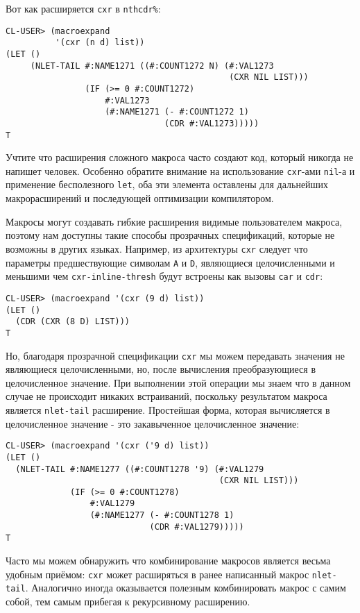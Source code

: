 Вот как расширяется \verb"cxr" в \verb"nthcdr%":

\begin{verbatim}
CL-USER> (macroexpand
          '(cxr (n d) list))
(LET ()
     (NLET-TAIL #:NAME1271 ((#:COUNT1272 N) (#:VAL1273 
                                             (CXR NIL LIST)))
                (IF (>= 0 #:COUNT1272)
                    #:VAL1273
                    (#:NAME1271 (- #:COUNT1272 1) 
                                (CDR #:VAL1273)))))
T
\end{verbatim}

Учтите что расширения сложного макроса часто создают код, который никогда не напишет человек. Особенно обратите внимание на использование \verb"cxr"-ами \verb"nil"-а и применение бесполезного \verb"let", оба эти элемента оставлены для дальнейших макрорасширений и последующей оптимизации компилятором.

Макросы могут создавать гибкие расширения видимые пользователем макроса, поэтому нам доступны такие способы прозрачных спецификаций, которые не возможны в других языках. Например, из архитектуры \verb"cxr" следует что параметры предшествующие символам \verb"A" и \verb"D", являющиеся целочисленными и меньшими чем \verb"cxr-inline-thresh" будут встроены как вызовы \verb"car" и \verb"cdr":

\begin{verbatim}
CL-USER> (macroexpand '(cxr (9 d) list))
(LET ()
  (CDR (CXR (8 D) LIST)))
T
\end{verbatim}

Но, благодаря прозрачной спецификации \verb"cxr" мы можем передавать значения не являющиеся целочисленными, но, после вычисления преобразующиеся в целочисленное значение. При выполнении этой операции мы знаем что в данном случае не происходит никаких встраиваний, поскольку результатом макроса является \verb"nlet-tail" расширение. Простейшая форма, которая вычисляется в целочисленное значение - это закавыченное целочисленное значение:

\begin{verbatim}
CL-USER> (macroexpand '(cxr ('9 d) list))
(LET ()
  (NLET-TAIL #:NAME1277 ((#:COUNT1278 '9) (#:VAL1279 
                                           (CXR NIL LIST)))
             (IF (>= 0 #:COUNT1278)
                 #:VAL1279
                 (#:NAME1277 (- #:COUNT1278 1) 
                             (CDR #:VAL1279)))))
T
\end{verbatim}

Часто мы можем обнаружить что комбинирование макросов является весьма удобным приёмом: \verb"cxr" может расширяться в ранее написанный макрос \verb"nlet-tail". Аналогично иногда оказывается полезным комбинировать макрос с самим собой, тем самым прибегая к рекурсивному расширению.

